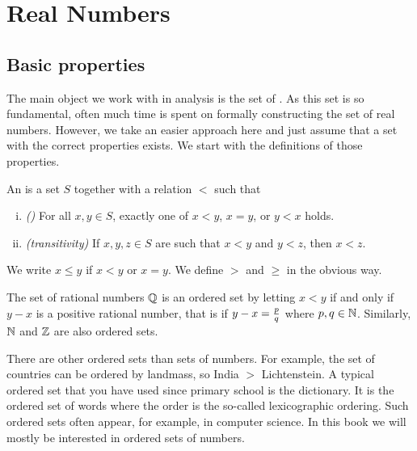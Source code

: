 \chapter{Real Numbers} \label{rn:chapter}


\section{Basic properties} \label{sec:basicpropsrn}


The main object we work with in analysis is the set of
.  As this set is so fundamental, often much time is
spent on formally constructing the set of real numbers.  However, we 
take an easier approach here and just assume that a set with the correct
properties exists.  We start with the definitions of those
properties.

\begin{defn}
An \emph{} is a set $S$ together with
a relation $<$ such that
\begin{enumerate}[(i)]
\item \emph{()} For all $x, y \in S$, exactly one of
$x < y$, $x=y$, or $y < x$ holds.
\item \emph{(transitivity)} If $x,y,z \in S$ are such that $x < y$ and $y
< z$, then $x < z$.
\end{enumerate}
We write $x \leq y$ if $x < y$ or $x=y$.  We define
$>$ and $\geq$ in the obvious way.
\end{defn}


The set of rational numbers $\Q$ is an ordered set by letting
$x < y$ if and only if $y-x$ is a positive rational number, that is
if $y-x = \nicefrac{p}{q}$ where $p,q \in \N$.  Similarly,
$\N$ and $\Z$ are also ordered sets.

There are other ordered sets than sets of numbers.  For example, the
set of countries can be ordered by landmass, so India $>$
Lichtenstein.
A typical ordered set that you have used since primary school is the
dictionary.  It is the ordered set of words where the order is the
so-called lexicographic ordering.  Such ordered sets often appear, for
example, in
computer science.  In this book we will mostly be interested in ordered
sets of numbers.

